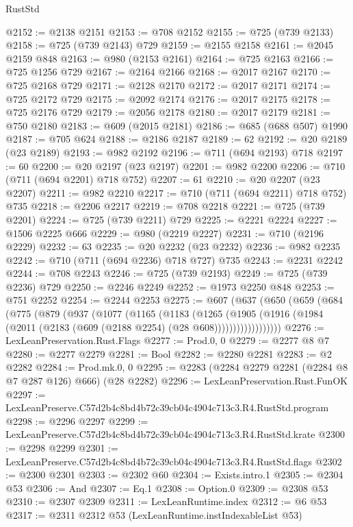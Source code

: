 \begin{lexlean}{RustStd}
\begin{coremodule}
@2152 := @2138 @2151
@2153 := @708 @2152
@2155 := @725 (@739 @2133)
@2158 := @725 (@739 @2143) @729
@2159 := @2155 @2158
@2161 := @2045 @2159 @848
@2163 := @980 (@2153 @2161)
@2164 := @725 @2163
@2166 := @725 @1256 @729
@2167 := @2164 @2166
@2168 := @2017 @2167
@2170 := @725 @2168 @729
@2171 := @2128 @2170
@2172 := @2017 @2171
@2174 := @725 @2172 @729
@2175 := @2092 @2174
@2176 := @2017 @2175
@2178 := @725 @2176 @729
@2179 := @2056 @2178
@2180 := @2017 @2179
@2181 := @750 @2180
@2183 := @609 (@2015 @2181)
@2186 := @685 (@688 @507) @1990
@2187 := @705 @624
@2188 := @2186 @2187
@2189 := 62
@2192 := @20 @2189 (@23 @2189)
@2193 := @982 @2192
@2196 := @711 (@694 @2193) @718
@2197 := 60
@2200 := @20 @2197 (@23 @2197)
@2201 := @982 @2200
@2206 := @710 (@711 (@694 @2201) @718 @752)
@2207 := 61
@2210 := @20 @2207 (@23 @2207)
@2211 := @982 @2210
@2217 := @710 (@711 (@694 @2211) @718 @752) @735
@2218 := @2206 @2217
@2219 := @708 @2218
@2221 := @725 (@739 @2201)
@2224 := @725 (@739 @2211) @729
@2225 := @2221 @2224
@2227 := @1506 @2225 @666
@2229 := @980 (@2219 @2227)
@2231 := @710 (@2196 @2229)
@2232 := 63
@2235 := @20 @2232 (@23 @2232)
@2236 := @982 @2235
@2242 := @710 (@711 (@694 @2236) @718 @727) @735
@2243 := @2231 @2242
@2244 := @708 @2243
@2246 := @725 (@739 @2193)
@2249 := @725 (@739 @2236) @729
@2250 := @2246 @2249
@2252 := @1973 @2250 @848
@2253 := @751 @2252
@2254 := @2244 @2253
@2275 := @607
    (@637
      (@650
        (@659
          (@684
            (@775
              (@879
                (@937
                  (@1077
                    (@1165
                      (@1183
                        (@1265
                          (@1905
                            (@1916
                              (@1984 (@2011 (@2183 (@609 (@2188 @2254) (@28 @608))))))))))))))))))
@2276 := LexLeanPreservation.Rust.Flags
@2277 := Prod.{0, 0}
@2279 := @2277 @8 @7
@2280 := @2277 @2279
@2281 := Bool
@2282 := @2280 @2281
@2283 := @2 @2282
@2284 := Prod.mk.{0, 0}
@2295 := @2283 (@2284 @2279 @2281 (@2284 @8 @7 @287 @126) @666) (@28 @2282)
@2296 := LexLeanPreservation.Rust.FunOK
@2297 := LexLeanPreserve.C57d2b4c8bd4b72c39cb04c4904c713c3.R4.RustStd.program
@2298 := @2296 @2297
@2299 := LexLeanPreserve.C57d2b4c8bd4b72c39cb04c4904c713c3.R4.RustStd.krate
@2300 := @2298 @2299
@2301 := LexLeanPreserve.C57d2b4c8bd4b72c39cb04c4904c713c3.R4.RustStd.flags
@2302 := @2300 @2301
@2303 := @2302 @60
@2304 := Exists.intro.{1}
@2305 := @2304 @53
@2306 := And
@2307 := Eq.{1}
@2308 := Option.{0}
@2309 := @2308 @53
@2310 := @2307 @2309
@2311 := LexLeanRuntime.index
@2312 := @6 @53
@2317 := @2311 @2312 @53 (LexLeanRuntime.instIndexableList @53)

\end{coremodule}
\end{lexlean}
